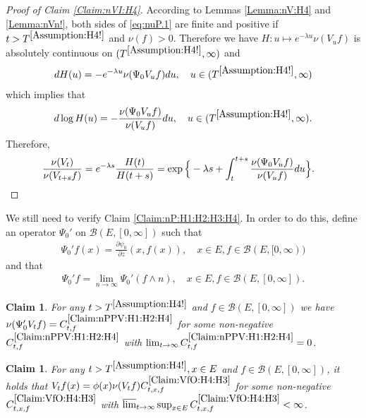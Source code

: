 \documentclass[12pt,a4paper]{amsart}
\numberwithin{equation}{section}
\theoremstyle{plain}
\newtheorem{claim}[thm]{Claim}
\theoremstyle{definition}
\theoremstyle{remark}
\newcounter{N}
\newcounter{n}[N]
\begin{document}
\begin{proof}[{Proof of Claim \ref{Claim:nVI:H4}}]
According to Lemmas \ref{Lemma:nV:H4} and \ref{Lemma:nVn!}, both sides of \eqref{eq:nuP.1} are finite and positive if $t> T^{\ref{Assumption:H4!}}$ and $\nu(f)>0$. 
Therefore we have $H: u\mapsto e^{-\lambda u}\nu(V_u f)$ is absolutely continuous on $(T^{\ref{Assumption:H4!}},\infty)$ and
\begin{align}
  d H(u) 
  = - e^{- \lambda u} \nu(\Psi_0 V_u f) du,
  \quad u\in (T^{\ref{Assumption:H4!}},\infty)
  \end{align}
 which implies that
\begin{align}
  d \log H(u) 
  = - \frac{\nu(\Psi_0 V_u f )}{ \nu(V_u f)} du,
  \quad u \in (T^{\ref{Assumption:H4!}},\infty).
  \end{align}
Therefore, 
\begin{align}
  & \frac{\nu(V_t)}{ \nu(V_{t+s}f)}
  = e^{- \lambda s} \frac{H(t)}{H(t+s)} 
  = \exp\Big\{-\lambda s + \int_t^{t+s} \frac{\nu(\Psi_0 V_u f)}{ \nu(V_u f)} du\Big\}.
  \qedhere
  \end{align}
\end{proof}
We still need to verify Claim \ref{Claim:nP:H1:H2:H3:H4}.
In order to do this, define an operator $\Psi_0'$ on $\mathcal B(E,[0,\infty])$ such that
\begin{align}
\Psi_0' f(x) 
= \frac{\partial \psi_0}{ \partial z} (x, f(x)),
\quad x\in E, f\in \mathcal B(E,[0,\infty))
\end{align}
and that
\begin{align}
\Psi_0' f 
= \lim_{n\to \infty} \Psi_0'(f\wedge n),
\quad x\in E, f\in \mathcal B(E,[0,\infty]).
\end{align}
\begin{claim} \label{Claim:nPPV:H1:H2:H4} 
For any $t > T^{\ref{Assumption:H4!}}$ and $f\in \mathcal B(E,[0,\infty])$ we have $\nu(\Psi_0' V_t f) = C^{\ref{Claim:nPPV:H1:H2:H4}}_{t,f}$ for some non-negative $C^{\ref{Claim:nPPV:H1:H2:H4}}_{t,f}$ with $\lim_{t\to \infty} C^{\ref{Claim:nPPV:H1:H2:H4}}_{t,f} = 0$.
\end{claim}
\begin{claim} \label{Claim:VfO:H4:H3} 
For any $t> T^{\ref{Assumption:H4!}}, x\in E$ and $f\in \mathcal B(E,[0,\infty])$, it holds that 
$V_t f(x) = \phi(x) \nu(V_tf) C^{\ref{Claim:VfO:H4:H3}}_{t,x,f}$ for some non-negative $C^{\ref{Claim:VfO:H4:H3}}_{t,x,f}$ with $\varlimsup_{t\to \infty} \sup_{x\in E} C^{\ref{Claim:VfO:H4:H3}}_{t,x,f} <\infty$.
\end{claim}
\end{document}
